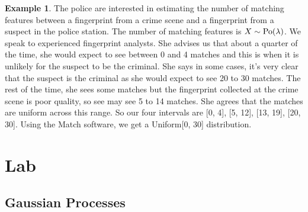 \documentclass[
]{book}
\theoremstyle{definition}
\theoremstyle{definition}
\newtheorem{example}{Example}[chapter]
\theoremstyle{definition}
\theoremstyle{definition}
\theoremstyle{remark}
\begin{document}
\begin{example}
The police are interested in estimating the number of matching features between a fingerprint from a crime scene and a fingerprint from a suspect in the police station. The number of matching features is \(X \sim \hbox{Po}(\lambda)\). We speak to experienced fingerprint analysts. She advises us that about a quarter of the time, she would expect to see between 0 and 4 matches and this is when it is unlikely for the suspect to be the criminal. She says in some cases, it's very clear that the suspect is the criminal as she would expect to see 20 to 30 matches. The rest of the time, she sees some matches but the fingerprint collected at the crime scene is poor quality, so see may see 5 to 14 matches. She agrees that the matches are uniform across this range. So our four intervals are {[}0, 4{]}, {[}5, 12{]}, {[}13, 19{]}, {[}20, 30{]}. Using the Match software, we get a Uniform{[}0, 30{]} distribution.
\end{example}

\hypertarget{lab-3}{%
\section{Lab}\label{lab-3}}

\hypertarget{gaussian-processes-1}{%
\subsection{Gaussian Processes}\label{gaussian-processes-1}}
\end{document}
